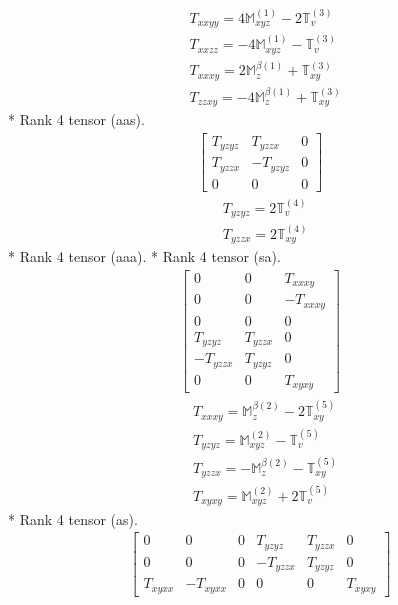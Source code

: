 \documentclass[fleqn,8pt,landscape]{jsarticle}
\begin{document}
\begin{align*}
& T_{xxyy} = 4 \mathbb{M}_{xyz}^{(1)} - 2 \mathbb{T}_{v}^{(3)} \\
& T_{xxzz} = - 4 \mathbb{M}_{xyz}^{(1)} - \mathbb{T}_{v}^{(3)} \\
& T_{xxxy} = 2 \mathbb{M}_{z}^{\beta(1)} + \mathbb{T}_{xy}^{(3)} \\
& T_{zzxy} = - 4 \mathbb{M}_{z}^{\beta(1)} + \mathbb{T}_{xy}^{(3)}
\end{align*}
* Rank 4 tensor (aas).
\begin{align*}
\begin{bmatrix} T_{yzyz} & T_{yzzx} & 0 \\ T_{yzzx} & - T_{yzyz} & 0 \\ 0 & 0 & 0 \end{bmatrix}
\end{align*}
\begin{align*}
& T_{yzyz} = 2 \mathbb{T}_{v}^{(4)} \\
& T_{yzzx} = 2 \mathbb{T}_{xy}^{(4)}
\end{align*}
* Rank 4 tensor (aaa).
* Rank 4 tensor (sa).
\begin{align*}
\begin{bmatrix} 0 & 0 & T_{xxxy} \\ 0 & 0 & - T_{xxxy} \\ 0 & 0 & 0 \\ T_{yzyz} & T_{yzzx} & 0 \\ - T_{yzzx} & T_{yzyz} & 0 \\ 0 & 0 & T_{xyxy} \end{bmatrix}
\end{align*}
\begin{align*}
& T_{xxxy} = \mathbb{M}_{z}^{\beta(2)} - 2 \mathbb{T}_{xy}^{(5)} \\
& T_{yzyz} = \mathbb{M}_{xyz}^{(2)} - \mathbb{T}_{v}^{(5)} \\
& T_{yzzx} = - \mathbb{M}_{z}^{\beta(2)} - \mathbb{T}_{xy}^{(5)} \\
& T_{xyxy} = \mathbb{M}_{xyz}^{(2)} + 2 \mathbb{T}_{v}^{(5)}
\end{align*}
* Rank 4 tensor (as).
\begin{align*}
\begin{bmatrix} 0 & 0 & 0 & T_{yzyz} & T_{yzzx} & 0 \\ 0 & 0 & 0 & - T_{yzzx} & T_{yzyz} & 0 \\ T_{xyxx} & - T_{xyxx} & 0 & 0 & 0 & T_{xyxy} \end{bmatrix}
\end{align*}
\end{document}
